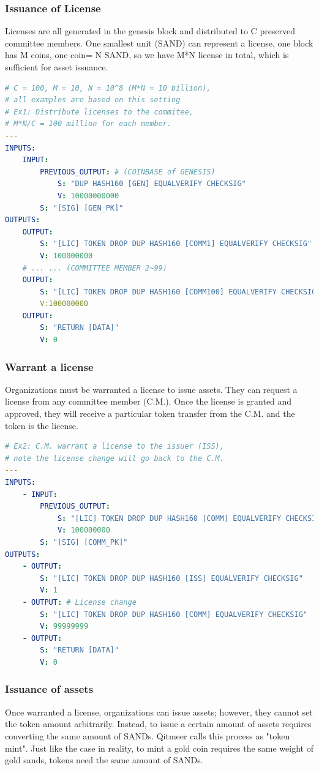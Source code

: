 \documentclass[a4paper,11pt]{article}
\begin{document}
\subsubsection{Issuance of License}

Licenses are all generated in the genesis block and distributed to C preserved committee members. One smallest unit (SAND) can represent a license, one block has M coins, one coin= N SAND, so we have M*N license in total, which is sufficient for asset issuance.

\begin{lstlisting}[language=yaml, numbers=none]
# C = 100, M = 10, N = 10^8 (M*N = 10 billion), 
# all examples are based on this setting
# Ex1: Distribute licenses to the commitee, 
# M*N/C = 100 million for each member.
---	
INPUTS:
	INPUT:
		PREVIOUS_OUTPUT: # (COINBASE of GENESIS)
			S: "DUP HASH160 [GEN] EQUALVERIFY CHECKSIG"
			V: 10000000000 
		S: "[SIG] [GEN_PK]"
OUTPUTS:
	OUTPUT:
		S: "[LIC] TOKEN DROP DUP HASH160 [COMM1] EQUALVERIFY CHECKSIG"
		V: 100000000 
	# ... ... (COMMITTEE MEMBER 2~99)
	OUTPUT:
		S: "[LIC] TOKEN DROP DUP HASH160 [COMM100] EQUALVERIFY CHECKSIG"
		V:100000000
	OUTPUT:
		S: "RETURN [DATA]" 
		V: 0
\end{lstlisting}



\subsubsection{Warrant a license}

Organizations must be warranted a license to issue assets. They can request a license from any committee member (C.M.). Once the license is granted and approved, they will receive a particular token transfer from the C.M. and the token is the license.

\lstset{basicstyle=\tiny,style=myListStyle}
\begin{lstlisting}[language=yaml, numbers=none]
# Ex2: C.M. warrant a license to the issuer (ISS), 
# note the license change will go back to the C.M.
---	
INPUTS:
	- INPUT:
		PREVIOUS_OUTPUT:
			S: "[LIC] TOKEN DROP DUP HASH160 [COMM] EQUALVERIFY CHECKSIG"
			V: 100000000
		S: "[SIG] [COMM_PK]"
OUTPUTS:
	- OUTPUT:
		S: "[LIC] TOKEN DROP DUP HASH160 [ISS] EQUALVERIFY CHECKSIG"
		V: 1
	- OUTPUT: # License change
		S: "[LIC] TOKEN DROP DUP HASH160 [COMM] EQUALVERIFY CHECKSIG"
		V: 99999999
	- OUTPUT:
		S: "RETURN [DATA]" 
		V: 0
\end{lstlisting}

\subsubsection{Issuance of assets}
Once warranted a license, organizations can issue assets; however, they cannot set the token amount arbitrarily. Instead, to issue a certain amount of assets requires converting the same amount of  SANDs. Qitmeer calls this process as  "token mint". Just like the case in reality,  to mint a gold coin requires the same weight of gold sands, tokens need the same amount of SANDs. 
\end{document}
